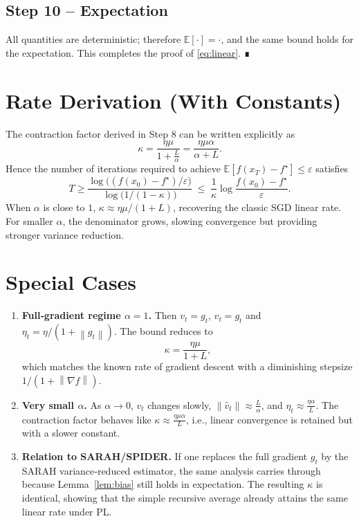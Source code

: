 \documentclass{article}
\newcommand{\E}{\mathbb{E}}
\newcommand{\norm}[1]{\left\|#1\right\|}
\begin{document}
\subsection*{Step 10 – Expectation}
All quantities are deterministic; therefore $\E[\cdot]=\cdot$, and the same bound holds for the expectation. This completes the proof of \eqref{eq:linear}. ∎

\section*{Rate Derivation (With Constants)}
The contraction factor derived in Step 8 can be written explicitly as
\[
    \kappa = \frac{\eta\mu}{1+\frac{L}{\alpha}}
          = \frac{\eta\mu\alpha}{\alpha+L}.
\]
Hence the number of iterations required to achieve $\E[f(x_T)-f^{\star}]\le\varepsilon$ satisfies
\[
    T \ge \frac{\log\bigl((f(x_0)-f^{\star})/\varepsilon\bigr)}
                 {\log\bigl(1/(1-\kappa)\bigr)}
      \;\le\; \frac{1}{\kappa}\log\frac{f(x_0)-f^{\star}}{\varepsilon}.
\]
When $\alpha$ is close to $1$, $\kappa\approx\eta\mu/(1+L)$, recovering the classic SGD linear rate. For smaller $\alpha$, the denominator grows, slowing convergence but providing stronger variance reduction.

\section*{Special Cases}
\begin{enumerate}[label=(\alph*)]
    \item \textbf{Full‑gradient regime $\alpha=1$.} Then $v_t=g_t$, $\hat v_t=g_t$ and $\eta_t=\eta/(1+\norm{g_t})$. The bound reduces to 
    \[
        \kappa = \frac{\eta\mu}{1+L},
    \]
    which matches the known rate of gradient descent with a diminishing stepsize $1/(1+\norm{\nabla f})$.
    \item \textbf{Very small $\alpha$.} As $\alpha\to 0$, $v_t$ changes slowly, $\norm{\hat v_t}\approx \frac{L}{\alpha}$, and $\eta_t\approx \frac{\eta\alpha}{L}$. The contraction factor behaves like $\kappa\approx \frac{\eta\mu\alpha}{L}$, i.e., linear convergence is retained but with a slower constant.
    \item \textbf{Relation to SARAH/SPIDER.} If one replaces the full gradient $g_t$ by the SARAH variance‑reduced estimator, the same analysis carries through because Lemma~\ref{lem:bias} still holds in expectation. The resulting $\kappa$ is identical, showing that the simple recursive average already attains the same linear rate under PL.
\end{enumerate}
\end{document}
